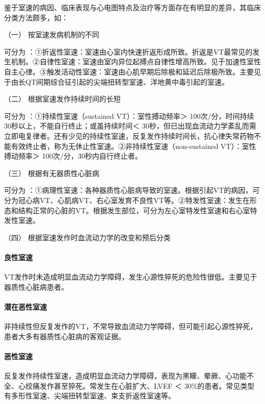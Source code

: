 鉴于室速的病因、临床表现与心电图特点及治疗等方面存在有明显的差异，其临床分类方法颇多，如：

\hypertarget{text00292.htmlux5cux23CHP10-2-5-2-3-1}{}
（一） 按室速发病机制的不同

可分为
：①折返性室速：室速由心室内快速折返形成所致。折返是VT最常见的发生机制。②自律性室速：室速由室内异位起搏点自律性增高所致。见于加速性室性自主心律。③触发活动性室速：室速由心肌早期后除极和延迟后除极所致。主要见于由长QT间期综合征引起的尖端扭转型室速、洋地黄中毒引起的室速。

\hypertarget{text00292.htmlux5cux23CHP10-2-5-2-3-2}{}
（二） 根据室速发作持续时间的长短

可分为 ：①持续性室速（sustained VT）：室性搏动频率＞
100次/分，时间持续30秒以上，不能自行终止；或虽持续时间＜
30秒，但已出现血流动力学紊乱而需立即电复律者。还有少见的持续性室速，反复发作持续时间长，抗心律失常药物不能有效终止者，称为无休止性室速。②非持续性室速（non-sustained
VT）：室性搏动频率＞ 100次/分，30秒内自行终止者。

\hypertarget{text00292.htmlux5cux23CHP10-2-5-2-3-3}{}
（三） 根据有无器质性心脏病

可分为
：①病理性室速：各种器质性心脏病导致的室速。根据引起VT的病因，可分为冠心病VT、心肌病VT、右心室发育不良性VT等。②特发性室速：发生在形态和结构正常的心脏的VT。根据发生部位，可分为左心室特发性室速和右心室特发性室速。

\hypertarget{text00292.htmlux5cux23CHP10-2-5-2-3-4}{}
（四） 根据室速发作时血流动力学的改变和预后分类

\paragraph{良性室速}

VT发作时未造成明显血流动力学障碍，发生心源性猝死的危险性很低。主要见于器质性心脏病患者。

\paragraph{潜在恶性室速}

非持续性但反复发作的VT，不常导致血流动力学障碍，但可能引起心源性猝死，患者大多有器质性心脏病的客观证据。

\paragraph{恶性室速}

反复发作持续性室速，造成明显血流动力学障碍，表现为黑矇、晕厥、心功能不全、心绞痛发作甚至猝死。常发生在心脏扩大、LVEF
＜ 30\%的患者。常见类型有多形性室速、尖端扭转型室速、束支折返性室速等。

